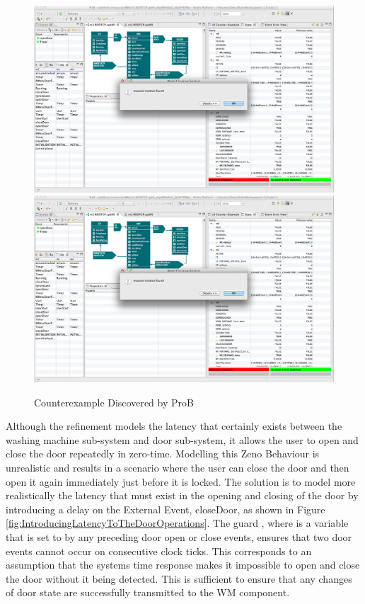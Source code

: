  \begin{figure}[!htbp]
  \centering
  \ifplastex
  \includegraphics[width=1024]{figures/image31.png}
  \else
  \includegraphics[width=1\textwidth]{figures/image31.png}
  \fi
  \caption{Counterexample Discovered by ProB}
  \label{fig:CounterexampleDiscoveredByProB}
\end{figure} 

Although the refinement models the latency that certainly exists between the washing machine sub-system and door sub-system, it allows the user to open and close the door repeatedly in zero-time. Modelling this Zeno Behaviour is unrealistic and results in a scenario where the user can close the door and then open it again immediately just before it is locked.
The solution is to model more realistically the latency that must exist in the opening and closing of the door by introducing a delay on the External Event, closeDoor, as shown in Figure \ref{fig:IntroducingLatencyToTheDoorOperations}. The guard  \textbf{}, where  is a variable that is set to  by any preceding door open or close events, ensures that two door events cannot occur on consecutive clock ticks. This corresponds to an assumption that the systems time response makes it impossible to open and close the door without it being detected. This is sufficient to ensure that any changes of door state are successfully transmitted to the WM component.
 
